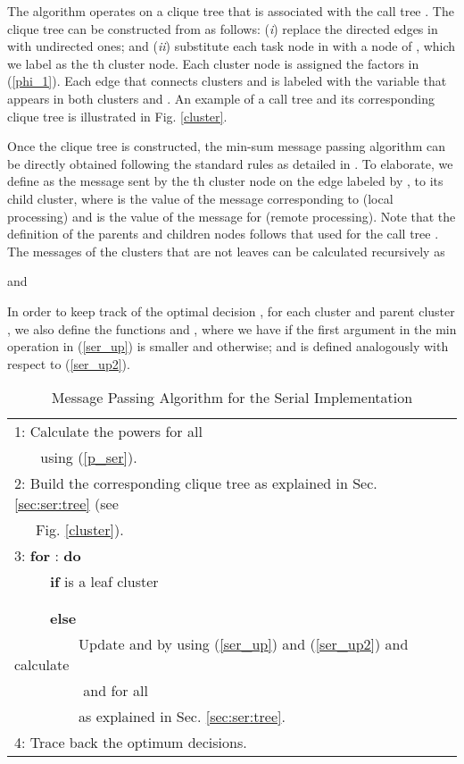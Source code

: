 \documentclass[journal,twocolumn,10pt,twoside]{IEEEtranTCOM}
\theoremstyle{plain}
\theoremstyle{plain}
\theoremstyle{remark}
\begin{document}
The algorithm operates on a clique tree  that is associated with the call tree . The clique tree  can be constructed from  as follows: (\textit{i}) replace the directed edges in  with undirected ones; and (\textit{ii}) substitute each task node  in  with a node of , which we label as the th cluster node. Each cluster node  is assigned the factors  in (\ref{phi_1}). Each edge that connects clusters  and  is labeled with the variable  that appears in both clusters  and .  An example of a call tree and its corresponding clique tree is illustrated in Fig. \ref{cluster}.

Once the clique tree is constructed, the min-sum message passing algorithm can be directly obtained following the standard rules as detailed in \cite[Ch. 10]{koller}. To elaborate, we define  as the message  sent by the th cluster node on the edge labeled by , to its child cluster, where  is the value of the message corresponding to  (local processing) and  is the value of the message for  (remote processing). Note that the definition of the parents and children nodes follows that used for the call tree . The messages of the clusters that are not leaves can be calculated recursively as

and

In order to keep track of the optimal decision , for each cluster  and parent cluster , we also define the functions  and , where we have  if the first argument in the min operation in (\ref{ser_up}) is smaller and  otherwise; and  is defined analogously with respect to (\ref{ser_up2}).
\begin{table}
 \caption{Message Passing Algorithm for the Serial Implementation}\label{tab2}
\begin{tabular}{l}
\hline
1: Calculate the powers  for all\\
~~~ using (\ref{p_ser}).\\
2: Build the corresponding clique tree as explained in Sec. \ref{sec:ser:tree} (see \\
~~~Fig. \ref{cluster}).\\
3:  \textbf{for} : \textbf{do}\\
~~~~~\textbf{if}  is a leaf cluster\\
\\
\\
~~~~~\textbf{else}\\
~~~~~~~~~Update  and   by using (\ref{ser_up}) and (\ref{ser_up2}) and calculate\\
~~~~~~~~~ and  for all \\
~~~~~~~~~as explained in Sec. \ref{sec:ser:tree}.\\
4: Trace back the optimum decisions.\\
\hline
\end{tabular}
\end{table}
\end{document}
